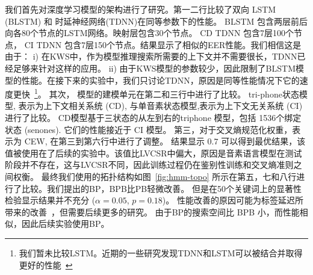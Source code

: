 我们首先对深度学习模型的架构进行了研究。第一二行比较了双向 LSTM (BLSTM) 和 时延神经网络(TDNN)在同等参数下的性能。 BLSTM 包含两层前后向各80个节点的LSTM网络。映射层包含30个节点。 CD TDNN 包含7层100个节点， CI TDNN 包含7层150个节点。结果显示了相似的EER性能。我们相信这是由于： i) 在KWS中，作为模型推理搜索所需要的上下文并不需要很长，TDNN已经足够来针对这样的应用。 ii) 由于KWS模型的参数较少，因此限制了BLSTM模型的性能。在接下来的实验中，我们只讨论TDNN，原因是同等性能情况下它的速度更快~\footnote{我们暂未比较LSTM。近期的一些研究发现TDNN和LSTM可以被结合并取得更好的性能~\cite{tdnnlstm}}。
其次， 模型的建模单元在第二和三行中进行了比较。 tri-phone状态模型, 表示为上下文相关系统 (CD), 与单音素状态模型,表示为上下文无关系统 (CI)进行了比较。
CD模型基于三状态的从左到右的triphone 模型，包括 1536个绑定状态 (senones). 
它们的性能接近于 CI 模型。 %
第三，对于交叉熵规范化权重，表示为 CEW, 在第三到第六行中进行了调整。
结果显示 $0.7$ 可以得到最优结果，该值被使用在了后续的实验中。该值比LVCSR中偏大，原因是音素语言模型在测试阶段并不存在，这与LVCSR不同，因此训练过程仍在鉴别性训练和交叉熵准则之间权衡。
最终我们使用的拓扑结构如图~\ref{fig:hmm-topo} 
%
所示在第五，七和八行进行了比较。我们提出的BP，BPB比PB\cite{povey2016purely}轻微改善。 
但是在50个关键词上的显著性检验显示结果并不充分 ($\alpha=0.05$, $p=0.18$)。 
性能改善的原因可能为标签延迟所带来的改善~\cite{amodei2015deep}，但需要后续更多的研究。 
由于BP的搜索空间比 BPB 小，而性能相似，因此后续实验使用BP。

